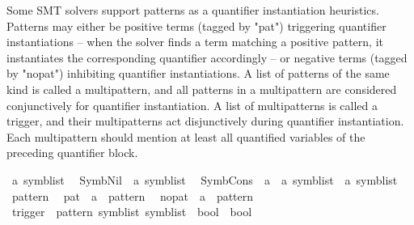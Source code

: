 \begin{isabellebody}
\isadelimdocument
%
\endisadelimdocument
%
\isatagdocument
%
\isamarkuptrue%
%
\endisatagdocument
{\isafolddocument}%
%
\isadelimdocument
%
\endisadelimdocument
%
\begin{isamarkuptext}%
Some SMT solvers support patterns as a quantifier instantiation
heuristics. Patterns may either be positive terms (tagged by "pat")
triggering quantifier instantiations -- when the solver finds a
term matching a positive pattern, it instantiates the corresponding
quantifier accordingly -- or negative terms (tagged by "nopat")
inhibiting quantifier instantiations. A list of patterns
of the same kind is called a multipattern, and all patterns in a
multipattern are considered conjunctively for quantifier instantiation.
A list of multipatterns is called a trigger, and their multipatterns
act disjunctively during quantifier instantiation. Each multipattern
should mention at least all quantified variables of the preceding
quantifier block.%
\end{isamarkuptext}\isamarkuptrue%
\isamarkupfalse%
\ {\isacharprime}{\kern0pt}a\ symb{\isacharunderscore}{\kern0pt}list\isanewline
\isanewline
{}\isamarkupfalse%
\isanewline
\ \ Symb{\isacharunderscore}{\kern0pt}Nil\ {\isacharcolon}{\kern0pt}{\isacharcolon}{\kern0pt}\ {\isachardoublequoteopen}{\isacharprime}{\kern0pt}a\ symb{\isacharunderscore}{\kern0pt}list{\isachardoublequoteclose}\isanewline
\ \ Symb{\isacharunderscore}{\kern0pt}Cons\ {\isacharcolon}{\kern0pt}{\isacharcolon}{\kern0pt}\ {\isachardoublequoteopen}{\isacharprime}{\kern0pt}a\ {\isasymRightarrow}\ {\isacharprime}{\kern0pt}a\ symb{\isacharunderscore}{\kern0pt}list\ {\isasymRightarrow}\ {\isacharprime}{\kern0pt}a\ symb{\isacharunderscore}{\kern0pt}list{\isachardoublequoteclose}\isanewline
\isanewline
{}\isamarkupfalse%
\ pattern\isanewline
\isanewline
{}\isamarkupfalse%
\isanewline
\ \ pat\ {\isacharcolon}{\kern0pt}{\isacharcolon}{\kern0pt}\ {\isachardoublequoteopen}{\isacharprime}{\kern0pt}a\ {\isasymRightarrow}\ pattern{\isachardoublequoteclose}\isanewline
\ \ nopat\ {\isacharcolon}{\kern0pt}{\isacharcolon}{\kern0pt}\ {\isachardoublequoteopen}{\isacharprime}{\kern0pt}a\ {\isasymRightarrow}\ pattern{\isachardoublequoteclose}\isanewline
\isanewline
{}\isamarkupfalse%
\ trigger\ {\isacharcolon}{\kern0pt}{\isacharcolon}{\kern0pt}\ {\isachardoublequoteopen}pattern\ symb{\isacharunderscore}{\kern0pt}list\ symb{\isacharunderscore}{\kern0pt}list\ {\isasymRightarrow}\ bool\ {\isasymRightarrow}\ bool{\isachardoublequoteclose}\ \isanewline

\end{isabellebody}
